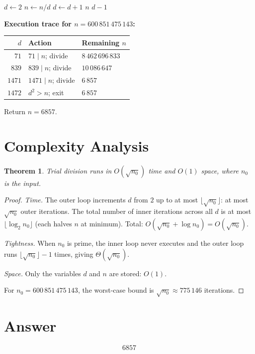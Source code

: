 \documentclass[11pt]{article}
\newtheorem{theorem}{Theorem}
\begin{document}
\begin{algorithm}[H]
\caption{\textsc{LargestPrimeFactor}$(n)$}
\begin{algorithmic}[1]
\STATE $d \gets 2$
        \STATE $n \gets n / d$
    \ENDWHILE
    \STATE $d \gets d + 1$
\ENDWHILE
{}
    \RETURN $n$
\ELSE
    \RETURN $d - 1$
\ENDIF
\end{algorithmic}
\end{algorithm}

\textbf{Execution trace for $n = 600\,851\,475\,143$:}

\begin{center}
\begin{tabular}{rll}
\toprule
$d$ & Action & Remaining $n$ \\
\midrule
$71$   & $71 \mid n$; divide & $8\,462\,696\,833$ \\
$839$  & $839 \mid n$; divide & $10\,086\,647$ \\
$1471$ & $1471 \mid n$; divide & $6\,857$ \\
$1472$ & $d^2 > n$; exit & $6\,857$ \\
\bottomrule
\end{tabular}
\end{center}

Return $n = 6857$.

\section{Complexity Analysis}

\begin{theorem}
Trial division runs in $O(\sqrt{n_0})$ time and $O(1)$ space, where $n_0$ is the input.
\end{theorem}

\begin{proof}
\emph{Time.} The outer loop increments $d$ from $2$ up to at most $\lfloor\sqrt{n_0}\rfloor$: at most $\sqrt{n_0}$ outer iterations. The total number of inner iterations across all $d$ is at most $\lfloor\log_2 n_0\rfloor$ (each halves $n$ at minimum). Total: $O(\sqrt{n_0} + \log n_0) = O(\sqrt{n_0})$.

\emph{Tightness.} When $n_0$ is prime, the inner loop never executes and the outer loop runs $\lfloor\sqrt{n_0}\rfloor - 1$ times, giving $\Theta(\sqrt{n_0})$.

\emph{Space.} Only the variables $d$ and $n$ are stored: $O(1)$.

For $n_0 = 600\,851\,475\,143$, the worst-case bound is $\sqrt{n_0} \approx 775\,146$ iterations.
\end{proof}

\section{Answer}

\[
\boxed{6857}
\]
\end{document}
